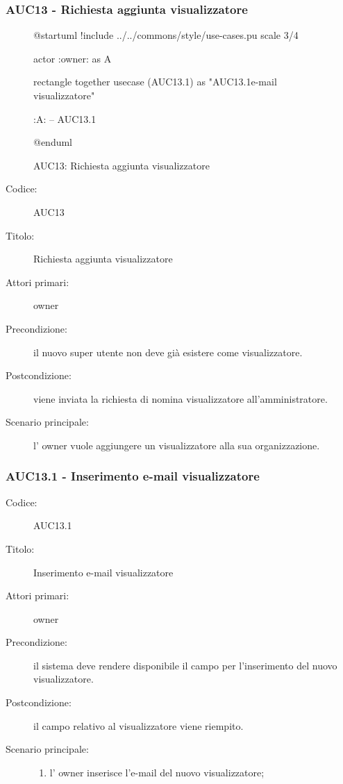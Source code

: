 \documentclass[casi-duso]{subfiles}
\begin{document}
\subsubsection{AUC13 - Richiesta aggiunta visualizzatore}%
\label{subsub:AUC13}

\begin{figure}[h!] 
  \centering 
  \begin{plantuml}
  @startuml
  !include ../../commons/style/use-cases.pu
  scale 3/4

  actor :owner: as A

  rectangle {
    together {
      usecase (AUC13.1) as "AUC13.1\nInserimento e-mail visualizzatore"
    }
  }

  :A: -- AUC13.1

  @enduml
  \end{plantuml} 
  \caption{AUC13: Richiesta aggiunta visualizzatore} 
  \label{fig:auc13} 
\end{figure}

\begin{description}
  \item[Codice:] AUC13
  \item[Titolo:] Richiesta aggiunta visualizzatore
  \item[Attori primari:] owner
  \item[Precondizione:] il nuovo super utente non deve già esistere come visualizzatore.
  \item[Postcondizione:] viene inviata la richiesta di nomina visualizzatore all'amministratore.
  \item[Scenario principale:] l' owner vuole aggiungere un visualizzatore alla sua organizzazione.
\end{description}

\subsubsection{AUC13.1 - Inserimento e-mail visualizzatore}%
\label{subsub:AUC13.1}
\begin{description}
  \item[Codice:] AUC13.1
  \item[Titolo:] Inserimento e-mail visualizzatore
  \item[Attori primari:] owner
  \item[Precondizione:] il sistema deve rendere disponibile il campo per l'inserimento del nuovo visualizzatore.
  \item[Postcondizione:] il campo relativo al visualizzatore viene riempito.
  \item[Scenario principale:] 
  \begin{enumerate}
    \item l' owner inserisce l'e-mail del nuovo visualizzatore;
  \end{enumerate}
\end{description}
\end{document}
